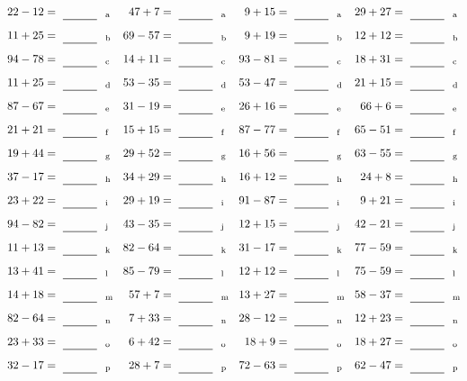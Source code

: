 \documentclass
[
  draft    = true,
  fontsize = 11pt,
  parskip  = half-
]
{scrartcl}
\begin{document}
\clearpage
\begin{align*}
    \pline{22-12}&=\rline{a}
  & \pline{47+7}&=\rline{a}
  & \pline{9+15}&=\rline{a}
  & \pline{29+27}&=\rline{a} \\[1ex]
    \pline{11+25}&=\rline{b}
  & \pline{69-57}&=\rline{b}
  & \pline{9+19}&=\rline{b}
  & \pline{12+12}&=\rline{b} \\[1ex]
    \pline{94-78}&=\rline{c}
  & \pline{14+11}&=\rline{c}
  & \pline{93-81}&=\rline{c}
  & \pline{18+31}&=\rline{c} \\[1ex]
    \pline{11+25}&=\rline{d}
  & \pline{53-35}&=\rline{d}
  & \pline{53-47}&=\rline{d}
  & \pline{21+15}&=\rline{d} \\[1ex]
    \pline{87-67}&=\rline{e}
  & \pline{31-19}&=\rline{e}
  & \pline{26+16}&=\rline{e}
  & \pline{66+6}&=\rline{e} \\[1ex]
    \pline{21+21}&=\rline{f}
  & \pline{15+15}&=\rline{f}
  & \pline{87-77}&=\rline{f}
  & \pline{65-51}&=\rline{f} \\[1ex]
    \pline{19+44}&=\rline{g}
  & \pline{29+52}&=\rline{g}
  & \pline{16+56}&=\rline{g}
  & \pline{63-55}&=\rline{g} \\[1ex]
    \pline{37-17}&=\rline{h}
  & \pline{34+29}&=\rline{h}
  & \pline{16+12}&=\rline{h}
  & \pline{24+8}&=\rline{h} \\[1ex]
    \pline{23+22}&=\rline{i}
  & \pline{29+19}&=\rline{i}
  & \pline{91-87}&=\rline{i}
  & \pline{9+21}&=\rline{i} \\[1ex]
    \pline{94-82}&=\rline{j}
  & \pline{43-35}&=\rline{j}
  & \pline{12+15}&=\rline{j}
  & \pline{42-21}&=\rline{j} \\[1ex]
    \pline{11+13}&=\rline{k}
  & \pline{82-64}&=\rline{k}
  & \pline{31-17}&=\rline{k}
  & \pline{77-59}&=\rline{k} \\[1ex]
    \pline{13+41}&=\rline{l}
  & \pline{85-79}&=\rline{l}
  & \pline{12+12}&=\rline{l}
  & \pline{75-59}&=\rline{l} \\[1ex]
    \pline{14+18}&=\rline{m}
  & \pline{57+7}&=\rline{m}
  & \pline{13+27}&=\rline{m}
  & \pline{58-37}&=\rline{m} \\[1ex]
    \pline{82-64}&=\rline{n}
  & \pline{7+33}&=\rline{n}
  & \pline{28-12}&=\rline{n}
  & \pline{12+23}&=\rline{n} \\[1ex]
    \pline{23+33}&=\rline{o}
  & \pline{6+42}&=\rline{o}
  & \pline{18+9}&=\rline{o}
  & \pline{18+27}&=\rline{o} \\[1ex]
    \pline{32-17}&=\rline{p}
  & \pline{28+7}&=\rline{p}
  & \pline{72-63}&=\rline{p}
  & \pline{62-47}&=\rline{p}
\end{align*}
\end{document}
